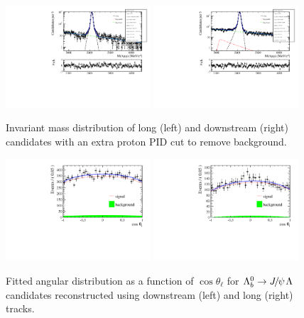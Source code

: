 \begin{figure}
\centering
\includegraphics[width=0.48\textwidth]{Lmumu/figs/Jpsi_default_LL_log_fitAndRes.pdf}
\includegraphics[width=0.48\textwidth]{Lmumu/figs/Jpsi_default_DD_log_fitAndRes.pdf}
\caption{Invariant mass distribution of \Lb\ra\jpsi\Lz long (left) and downstream (right)
candidates with an extra proton PID cut to remove \KS background. }
\label{fig:Jpsimass_angular}
\end{figure}
%
\begin{figure}[h]
\centering
\includegraphics[width=0.48\textwidth]{Lmumu/figs/AngularDistribs/Fitted/Afb_DD_jpsi.pdf}
\includegraphics[width=0.48\textwidth]{Lmumu/figs/AngularDistribs/Fitted/Afb_LL_jpsi.pdf}
\caption{Fitted angular distribution as a function of $\cos\theta_\ell$ for $\Lb\to\jpsi\Lz$ candidates
reconstructed using downstream (left) and long (right) tracks. }
\label{fig:AngFitJpsi}
\end{figure}
